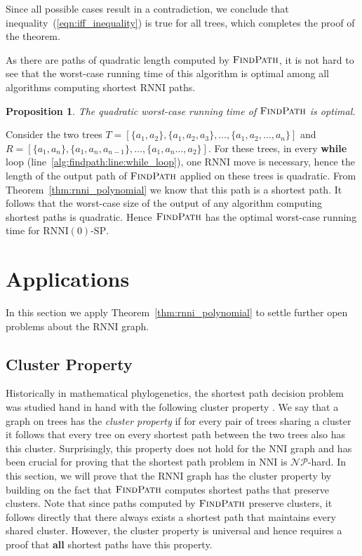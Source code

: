 \documentclass[11pt]{amsart}
\newtheorem{proposition}{Proposition}
\newcommand{\rnni}{\mathrm{RNNI}}
\newcommand{\findpath}{\textsc{FindPath}}
\newcommand{\nni}{\mathrm{NNI}}
\newcommand{\np}{\mathcal{NP}}
\newcommand{\decprob}[1]{\rnni(#1)\text{-}\mathrm{SP}}
\newcommand{\summary}[1]{} %
\begin{document}
Since all possible cases result in a contradiction, we conclude that inequality~(\ref{eqn:iff_inequality}) is true for all trees, which completes the proof of the theorem.
\endproof

As there are paths of quadratic length computed by $\findpath$, it is not hard to see that the worst-case running time of this algorithm is optimal among all algorithms computing shortest $\rnni$ paths.

\begin{proposition}
	The quadratic worst-case running time of $\findpath$ is optimal.
\end{proposition}

\proof
	Consider the two trees $T = [\{a_1,a_2\},\{a_1,a_2,a_3\},\ldots,\{a_1,a_2,\ldots,a_n\}]$ and $R = [\{a_1,a_n\}, \{a_1,a_n,a_{n-1}\},\ldots,\{a_1,a_n\ldots,a_2\}]$.
	For these trees, in every \textbf{while} loop (line~\ref{alg:findpath:line:while_loop}), one $\rnni$ move is necessary, hence the length of the output path of $\findpath$ applied on these trees is quadratic.
	From Theorem~\ref{thm:rnni_polynomial} we know that this path is a shortest path.
	It follows that the worst-case size of the output of any algorithm computing shortest paths is quadratic.
	Hence $\findpath$ has the optimal worst-case running time for $\decprob{0}$.
\endproof


\section{Applications}

In this section we apply Theorem~\ref{thm:rnni_polynomial} to settle further open problems about the $\rnni$ graph.

\subsection{Cluster Property}

\summary{Some words on the cluster property}
Historically in mathematical phylogenetics, the shortest path decision problem was studied hand in hand with the following cluster property \autocite{Dasgupta2000-xa}.
We say that a graph on trees has the \emph{cluster property} if for every pair of trees sharing a cluster it follows that every tree on every shortest path between the two trees also has this cluster.
Surprisingly, this property does not hold for the $\nni$ graph \autocite{Li1996-zw} and has been crucial for proving \autocite{Dasgupta2000-xa} that the shortest path problem in $\nni$ is $\np$-hard.
In this section, we will prove that the $\rnni$ graph has the cluster property by building on the fact that $\findpath$ computes shortest paths that preserve clusters.
Note that since paths computed by $\findpath$ preserve clusters, it follows directly that there always exists a shortest path that maintains every shared cluster.
However, the cluster property is universal and hence requires a proof that \textbf{all} shortest paths have this property.
\end{document}
